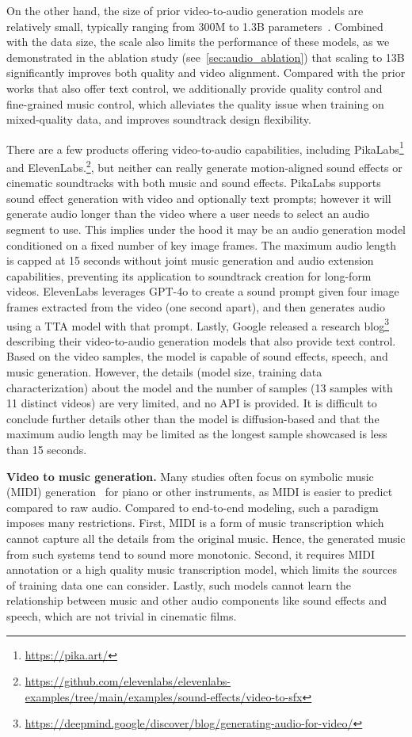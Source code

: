 On the other hand, the size of prior video-to-audio generation models are relatively small, typically ranging from 300M to 1.3B parameters~\citep{xing2024seeing, luo2024diff, mei2023foleygen}. Combined with the data size, the scale also limits the performance of these models, as we demonstrated in the ablation study (see~\cref{sec:audio_ablation}) that scaling to 13B significantly improves both quality and video alignment.
Compared with the prior works that also offer text control, we additionally provide quality control and fine-grained music control, which alleviates the quality issue when training on mixed-quality data, and improves soundtrack design flexibility.

There are a few products offering video-to-audio capabilities, including PikaLabs\footnote{\url{https://pika.art/}} and ElevenLabs.\footnote{\url{https://github.com/elevenlabs/elevenlabs-examples/tree/main/examples/sound-effects/video-to-sfx}}, but neither can really generate motion-aligned sound effects or cinematic soundtracks with both music and sound effects. PikaLabs supports sound effect generation with video and optionally text prompts; however it will generate audio longer than the video where a user needs to select an audio segment to use. This implies under the hood it may be an audio generation model conditioned on a fixed number of key image frames. The maximum audio length is capped at 15 seconds without joint music generation and audio extension capabilities, preventing its application to soundtrack creation for long-form videos.
ElevenLabs leverages GPT-4o to create a sound prompt given four image frames extracted from the video (one second apart), and then generates audio using a TTA model with that prompt.
Lastly, Google released a research blog\footnote{\url{https://deepmind.google/discover/blog/generating-audio-for-video/}} describing their video-to-audio generation models that also provide text control. Based on the video samples, the model is capable of sound effects, speech, and music generation. However, the details (model size, training data characterization) about the model and the number of samples (13 samples with 11 distinct videos) are very limited, and no API is provided. It is difficult to conclude further details other than the model is diffusion-based and that the maximum audio length may be limited as the longest sample showcased is less than 15 seconds.

\textbf{Video to music generation.}
Many studies often focus on symbolic music (MIDI) generation~\citep{Di2021VideoBM, Zhuo2022VideoBM, Kang2023Video2MusicSM} for piano or other instruments, as MIDI is easier to predict compared to raw audio. Compared to end-to-end modeling, such a paradigm imposes many restrictions. First, MIDI is a form of music transcription which cannot capture all the details from the original music. Hence, the generated music from such systems tend to sound more monotonic. Second, it requires MIDI annotation or a high quality music transcription model, which limits the sources of training data one can consider. Lastly, such models cannot learn the relationship between music and other audio components like sound effects and speech, which are not trivial in cinematic films.


